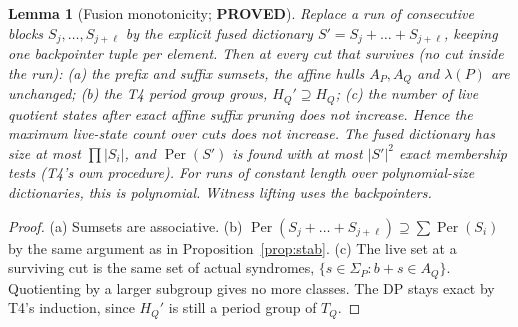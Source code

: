 \documentclass[11pt]{article}
\newtheorem{lemma}[proposition]{Lemma}
\newcommand{\Per}{\operatorname{Per}}
\begin{document}
\begin{lemma}[Fusion monotonicity; \textbf{PROVED}]\label{lem:fuse}
Replace a run of consecutive blocks $S_j,\dots,S_{j+\ell}$ by the explicit fused dictionary $S'=S_j+\dots+S_{j+\ell}$, keeping one backpointer tuple per element.
Then at every cut that survives (no cut inside the run): (a) the prefix and suffix sumsets, the affine hulls $A_P,A_Q$ and $\lambda(P)$ are unchanged;
(b) the T4 period group grows, $H_Q'\supseteq H_Q$; (c) the number of live quotient states after exact affine suffix pruning does not increase.
Hence the maximum live-state count over cuts does not increase. The fused dictionary has size at most $\prod|S_i|$, and $\Per(S')$ is found with at most $|S'|^2$ exact
membership tests (T4's own procedure). For runs of constant length over polynomial-size dictionaries, this is polynomial. Witness lifting uses the backpointers.
\end{lemma}
\begin{proof}
(a) Sumsets are associative. (b) $\Per(S_j+\dots+S_{j+\ell})\supseteq\sum\Per(S_i)$ by the same argument as in Proposition~\ref{prop:stab}.
(c) The live set at a surviving cut is the same set of actual syndromes, $\{s\in\Sigma_P: b+s\in A_Q\}$. Quotienting by a larger subgroup gives no more classes.
The DP stays exact by T4's induction, since $H_Q'$ is still a period group of $T_Q$.
\end{proof}
\end{document}
